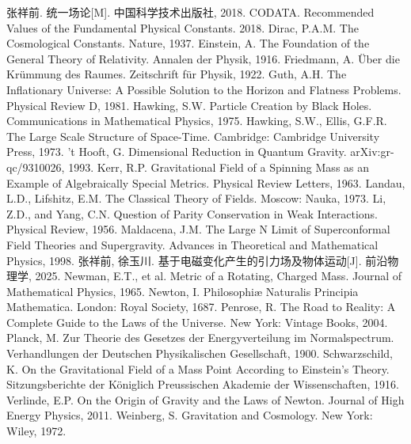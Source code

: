 \documentclass[12pt,a4paper]{article}
\begin{document}
\begin{thebibliography}{99}

 张祥前. 统一场论[M]. 中国科学技术出版社, 2018.
 CODATA. Recommended Values of the Fundamental Physical Constants. 2018.
 Dirac, P.A.M. The Cosmological Constants. Nature, 1937.
 Einstein, A. The Foundation of the General Theory of Relativity. Annalen der Physik, 1916.
 Friedmann, A. Über die Krümmung des Raumes. Zeitschrift für Physik, 1922.
 Guth, A.H. The Inflationary Universe: A Possible Solution to the Horizon and Flatness Problems. Physical Review D, 1981.
 Hawking, S.W. Particle Creation by Black Holes. Communications in Mathematical Physics, 1975.
 Hawking, S.W., Ellis, G.F.R. The Large Scale Structure of Space-Time. Cambridge: Cambridge University Press, 1973.
 't Hooft, G. Dimensional Reduction in Quantum Gravity. arXiv:gr-qc/9310026, 1993.
 Kerr, R.P. Gravitational Field of a Spinning Mass as an Example of Algebraically Special Metrics. Physical Review Letters, 1963.
 Landau, L.D., Lifshitz, E.M. The Classical Theory of Fields. Moscow: Nauka, 1973.
 Li, Z.D., and Yang, C.N. Question of Parity Conservation in Weak Interactions. Physical Review, 1956.
 Maldacena, J.M. The Large N Limit of Superconformal Field Theories and Supergravity. Advances in Theoretical and Mathematical Physics, 1998.
 张祥前, 徐玉川. 基于电磁变化产生的引力场及物体运动[J]. 前沿物理学, 2025.
 Newman, E.T., et al. Metric of a Rotating, Charged Mass. Journal of Mathematical Physics, 1965.
 Newton, I. Philosophiæ Naturalis Principia Mathematica. London: Royal Society, 1687.
 Penrose, R. The Road to Reality: A Complete Guide to the Laws of the Universe. New York: Vintage Books, 2004.
 Planck, M. Zur Theorie des Gesetzes der Energyverteilung im Normalspectrum. Verhandlungen der Deutschen Physikalischen Gesellschaft, 1900.
 Schwarzschild, K. On the Gravitational Field of a Mass Point According to Einstein's Theory. Sitzungsberichte der Königlich Preussischen Akademie der Wissenschaften, 1916.
 Verlinde, E.P. On the Origin of Gravity and the Laws of Newton. Journal of High Energy Physics, 2011.
 Weinberg, S. Gravitation and Cosmology. New York: Wiley, 1972.

\end{thebibliography}
\end{document}
